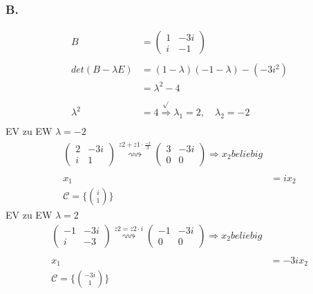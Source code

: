 \documentclass{article} %
\begin{document}
\subsubsection{B.}
\begin{align*}
    B & = \begin{pmatrix}
    1 & -3i \\ i & -1
    \end{pmatrix} \\ \\
    det(B - \lambda E) & = (1-\lambda) (-1-\lambda) - (-3i^2) \\
    & = \lambda^2 -4 \\ \\
    \lambda^2 & = 4 \overset{\sqrt{}}{\Rightarrow} \lambda_1 = 2, \quad \lambda_2 = -2 \\ 
\end{align*}
EV zu EW $\lambda = -2$
\begin{align*}
    \begin{pmatrix}
    2 & -3i \\ i & 1 
    \end{pmatrix} \overset{z2 + z1 \cdot \frac{-i}{3}}{\rightsquigarrow }\begin{pmatrix}
    3 & -3i \\ 0 & 0 
    \end{pmatrix} \Rightarrow x_2 beliebig \\ \\
    x_1 & = i x_2 \\
     \mathcal{C} = \Biggl \{ \binom{i}{1} \Biggr \}
\end{align*}
EV zu EW $\lambda = 2$
\begin{align*}
    \begin{pmatrix}
    -1 & -3i \\ i & -3 
    \end{pmatrix}  \overset{z2 = z2 \cdot i}{\rightsquigarrow }
    \begin{pmatrix}
    -1 & -3i \\ 0 & 0 
    \end{pmatrix} \Rightarrow x_2 beliebig \\ \\
     x_1 & = -3i x_2 \\
      \mathcal{C} = \Biggl \{ \binom{-3i}{1} \Biggr \}
\end{align*}
\end{document}
